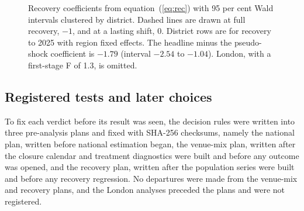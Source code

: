 \documentclass[11pt,a4paper]{article}
\begin{document}
\begin{figure}[htbp]
\centering
{}
\caption{Recovery coefficients from equation~(\ref{eq:rec}) with 95 per cent Wald intervals clustered by district. Dashed lines are drawn at full recovery, $-1$, and at a lasting shift, 0. District rows are for recovery to 2025 with region fixed effects. The headline minus the pseudo-shock coefficient is $-1.79$ (interval $-2.54$ to $-1.04$). London, with a first-stage F of 1.3, is omitted.}\label{fig:rec}
\end{figure}

\subsection{Registered tests and later choices}

To fix each verdict before its result was seen, the decision rules were written into three pre-analysis plans and fixed with SHA-256 checksums, namely the national plan, written before national estimation began, the venue-mix plan, written after the closure calendar and treatment diagnostics were built and before any outcome was opened, and the recovery plan, written after the population series were built and before any recovery regression. No departures were made from the venue-mix and recovery plans, and the London analyses preceded the plans and were not registered.
\end{document}
